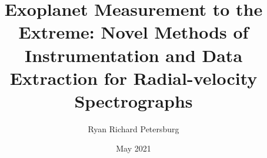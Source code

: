 \documentclass[12pt]{yalephd}
\begin{document}
\titlespacing*{\chapter}{0pt}{50pt}{30pt}%

	\title{Exoplanet Measurement to the Extreme: Novel Methods of Instrumentation and Data Extraction for Radial-velocity Spectrographs}
	\author{Ryan Richard Petersburg}
	\date{May 2021}


    
	
    \maketitle
    \makecopyright
	
    
    
	
    \tableofcontents
    \listoffigures
    \listoftables
    
    \mainmatter      %

	
	
	
	
	
	

    
    
    
\end{document}
